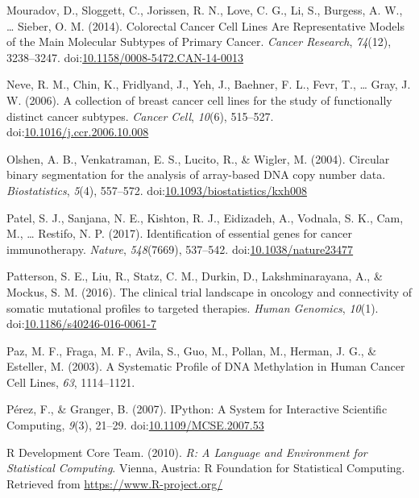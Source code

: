 \documentclass[man]{apa6}
\begin{document}
\hypertarget{ref-mouradov2014}{}
Mouradov, D., Sloggett, C., Jorissen, R. N., Love, C. G., Li, S.,
Burgess, A. W., \ldots{} Sieber, O. M. (2014). Colorectal Cancer Cell
Lines Are Representative Models of the Main Molecular Subtypes of
Primary Cancer. \emph{Cancer Research}, \emph{74}(12), 3238--3247.
doi:\href{https://doi.org/10.1158/0008-5472.CAN-14-0013}{10.1158/0008-5472.CAN-14-0013}

\hypertarget{ref-neve2006}{}
Neve, R. M., Chin, K., Fridlyand, J., Yeh, J., Baehner, F. L., Fevr, T.,
\ldots{} Gray, J. W. (2006). A collection of breast cancer cell lines
for the study of functionally distinct cancer subtypes. \emph{Cancer
Cell}, \emph{10}(6), 515--527.
doi:\href{https://doi.org/10.1016/j.ccr.2006.10.008}{10.1016/j.ccr.2006.10.008}

\hypertarget{ref-olshen2004}{}
Olshen, A. B., Venkatraman, E. S., Lucito, R., \& Wigler, M. (2004).
Circular binary segmentation for the analysis of array-based DNA copy
number data. \emph{Biostatistics}, \emph{5}(4), 557--572.
doi:\href{https://doi.org/10.1093/biostatistics/kxh008}{10.1093/biostatistics/kxh008}

\hypertarget{ref-patel2017}{}
Patel, S. J., Sanjana, N. E., Kishton, R. J., Eidizadeh, A., Vodnala, S.
K., Cam, M., \ldots{} Restifo, N. P. (2017). Identification of essential
genes for cancer immunotherapy. \emph{Nature}, \emph{548}(7669),
537--542.
doi:\href{https://doi.org/10.1038/nature23477}{10.1038/nature23477}

\hypertarget{ref-patterson2016}{}
Patterson, S. E., Liu, R., Statz, C. M., Durkin, D., Lakshminarayana,
A., \& Mockus, S. M. (2016). The clinical trial landscape in oncology
and connectivity of somatic mutational profiles to targeted therapies.
\emph{Human Genomics}, \emph{10}(1).
doi:\href{https://doi.org/10.1186/s40246-016-0061-7}{10.1186/s40246-016-0061-7}

\hypertarget{ref-paz2003}{}
Paz, M. F., Fraga, M. F., Avila, S., Guo, M., Pollan, M., Herman, J. G.,
\& Esteller, M. (2003). A Systematic Profile of DNA Methylation in Human
Cancer Cell Lines, \emph{63}, 1114--1121.

\hypertarget{ref-perez2007}{}
Pérez, F., \& Granger, B. (2007). IPython: A System for Interactive
Scientific Computing, \emph{9}(3), 21--29.
doi:\href{https://doi.org/10.1109/MCSE.2007.53}{10.1109/MCSE.2007.53}

\hypertarget{ref-rdevelopmentcoreteam2010}{}
R Development Core Team. (2010). \emph{R: A Language and Environment for
Statistical Computing}. Vienna, Austria: R Foundation for Statistical
Computing. Retrieved from \url{https://www.R-project.org/}
\end{document}
